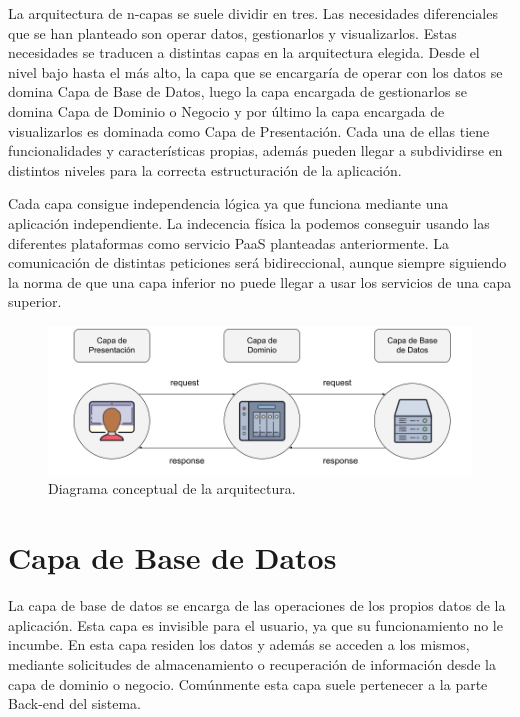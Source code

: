 \vspace{0.3cm}

La arquitectura de n-capas se suele dividir en tres. Las necesidades diferenciales que se han planteado son operar datos, gestionarlos y visualizarlos. Estas necesidades se traducen a distintas capas en la arquitectura elegida. Desde el nivel bajo hasta el más alto, la capa que se encargaría de operar con los datos se domina Capa de Base de Datos, luego la capa encargada de gestionarlos se domina Capa de Dominio o Negocio y por último la capa encargada de visualizarlos es dominada como Capa de Presentación. Cada una de ellas tiene funcionalidades y características propias, además pueden llegar a subdividirse en distintos niveles para la correcta estructuración de la aplicación.

\vspace{0.3cm}

Cada capa consigue independencia lógica ya que funciona mediante una aplicación independiente. La indecencia física la podemos conseguir usando las diferentes plataformas como servicio \ac{PaaS} planteadas anteriormente. La comunicación de distintas peticiones será bidireccional, aunque siempre siguiendo la norma de que una capa inferior no puede llegar a usar los servicios de una capa superior.

\vspace{0.3cm}

\begin{figure}[H]
    \centering
    \myfloatalign
    \includegraphics[width=1.03\textwidth]{gfx/Diagrama-arquitectura.png}
    \caption[Diagrama conceptual de la arquitectura]{Diagrama conceptual de la arquitectura.}\label{gfx:Diagrama-arquitectura}
\end{figure}

\section{Capa de Base de Datos}
La capa de base de datos se encarga de las operaciones de los propios datos de la aplicación. Esta capa es invisible para el usuario, ya que su funcionamiento no le incumbe. En esta capa residen los datos y además se acceden a los mismos, mediante solicitudes de almacenamiento o recuperación de información desde la capa de dominio o negocio. Comúnmente esta capa suele pertenecer a la parte Back-end del sistema.

